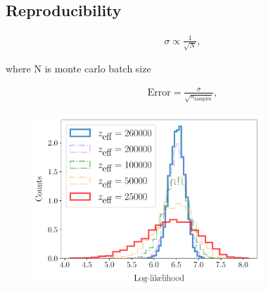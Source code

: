 \documentclass[aps,superscriptaddress,twocolumn,nopreprintnumbers,floatfix,groupedaddress]{revtex4-1}
\newcommand{\figwidth}{8.6cm}
\begin{document}
\subsection{Reproducibility}

\begin{align}\label{eq:sigma}
\sigma \propto \frac{1}{\sqrt{N}},
\end{align}

where N is monte carlo batch size

\begin{align}\label{eq:error}
\text{Error} = \frac{\sigma}{\sqrt{n_{\text{samples}}}},
\end{align}



\begin{figure}
	\centering
	\includegraphics[width=\figwidth]{figs/hists_rect.pdf}
	\caption{}
	\label{fig:hists}
\end{figure}
\end{document}
